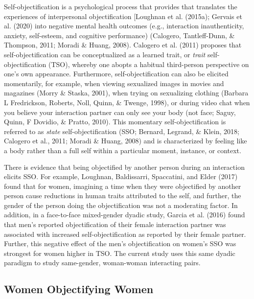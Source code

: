 \documentclass[man]{apa6}
\begin{document}
Self-objectification is a psychological process that provides that
translates the experiences of interpersonal objectification {[}Loughnan
et al. (2015a); Gervais et al. (2020) into negative mental health
outcomes (e.g., interaction inauthenticity, anxiety, self-esteem, and
cognitive performance) (Calogero, Tantleff-Dunn, \& Thompson, 2011;
Moradi \& Huang, 2008). Calogero et al. (2011) proposes that
self-objectification can be conceptualized as a learned trait, or
\emph{trait} self-objectification (TSO), whereby one abopts a habitual
third-person perspective on one's own appearance. Furthermore,
self-objectification can also be elicited momentarily, for example, when
viewing sexualized images in movies and magazines (Morry \& Staska,
2001), when trying on sexualizing clothing (Barbara L Fredrickson,
Roberts, Noll, Quinn, \& Twenge, 1998), or during video chat when you
believe your interaction partner can only see your body (not face;
Saguy, Quinn, F Dovidio, \& Pratto, 2010). This momentary
self-objectification is referred to as \emph{state} self-objectification
(SSO; Bernard, Legrand, \& Klein, 2018; Calogero et al., 2011; Moradi \&
Huang, 2008) and is characterized by feeling like a body rather than a
full self within a particular moment, instance, or context.

There is evidence that being objectified by another person during an
interaction elicits SSO. For example, Loughnan, Baldissarri, Spaccatini,
and Elder (2017) found that for women, imagining a time when they were
objectified by another person cause reductions in human traits
attributed to the self, and further, the gender of the person doing the
objectification was not a moderating factor. In addition, in a
face-to-face mixed-gender dyadic study, Garcia et al. (2016) found that
men's reported objectification of their female interaction partner was
associated with increased self-objectification as reported by their
female partner. Further, this negative effect of the men's
objectification on women's SSO was strongest for women higher in TSO.
The current study uses this same dyadic paradigm to study same-gender,
woman-woman interacting pairs.

\subsection{Women Objectifying Women}\label{women-objectifying-women}
\end{document}
